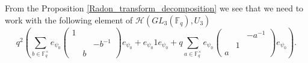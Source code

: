 \documentclass[12pt,reqno]{amsart}
\theoremstyle{definition}
\theoremstyle{remark}
\numberwithin{equation}{section}
\newcommand{\GL}[1]{GL_{#1}(\mathbb{F}_q)}
\begin{document}
From the Proposition \ref{Radon_transform_decomposition} we see that we need to work with the following element of $\mathcal{H}(\GL{3},U_3)$
\[
q^2\left( \sum_{b \in \mathbb{F}_q^\times}e_{\psi_0} \begin{pmatrix}
            1 & &\\
            & & -b^{-1}\\
            & b &
        \end{pmatrix}e_{\psi_0} + 
         e_{\psi_0} 1 e_{\psi_0} + q\sum_{a \in \mathbb{F}_q^\times}e_{\psi_0}\begin{pmatrix}
            & & -a^{-1}\\
            & 1 &\\
            a & &
        \end{pmatrix} e_{\psi_0}\right).
\]





\end{document}
